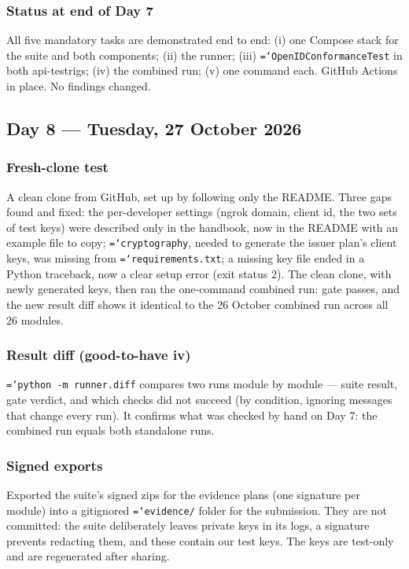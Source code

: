 \documentclass[11pt,a4paper]{article}
\let\origtexttt\texttt
\renewcommand{\texttt}[1]{\origtexttt{\hyphenchar\font=`\-\relax #1}}
\renewcommand{\_}{\textunderscore\allowbreak}
\begin{document}
\subsubsection*{Status at end of Day 7}
All five mandatory tasks are demonstrated end to end: (i) one Compose stack for the suite and
both components; (ii) the runner; (iii) \texttt{OpenIDConformanceTest} in both api-testrigs;
(iv) the combined run; (v) one command each. GitHub Actions in place. No findings changed.


\subsection{Day 8 --- Tuesday, 27 October 2026}

\subsubsection*{Fresh-clone test}
A clean clone from GitHub, set up by following only the README. Three gaps found and fixed:
the per-developer settings (ngrok domain, client id, the two sets of test keys) were described
only in the handbook, now in the README with an example file to copy; \texttt{cryptography},
needed to generate the issuer plan's client keys, was missing from \texttt{requirements.txt};
a missing key file ended in a Python traceback, now a clear setup error (exit status 2). The
clean clone, with newly generated keys, then ran the one-command combined run: gate passes,
and the new result diff shows it identical to the 26 October combined run across all 26
modules.

\subsubsection*{Result diff (good-to-have iv)}
\texttt{python -m runner.diff} compares two runs module by module --- suite result, gate
verdict, and which checks did not succeed (by condition, ignoring messages that change every
run). It confirms what was checked by hand on Day 7: the combined run equals both standalone
runs.

\subsubsection*{Signed exports}
Exported the suite's signed zips for the evidence plans (one signature per module) into a
gitignored \texttt{evidence/} folder for the submission. They are not committed: the suite
deliberately leaves private keys in its logs, a signature prevents redacting them, and these
contain our test keys. The keys are test-only and are regenerated after sharing.
\end{document}
